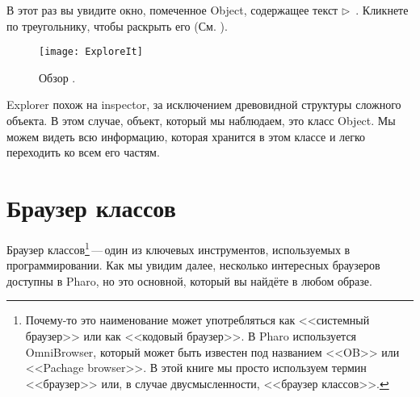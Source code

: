 \documentclass[a4paper,10pt,twoside]{book}
\begin{document}
В этот раз вы увидите окно, помеченное Object,
содержащее текст \mbox{$\triangleright$ }.
Кликнете по треугольнику, чтобы раскрыть его (См. ).

\begin{figure}[htb]
\centerline {\texttt{[image: ExploreIt]}}
\caption{Обзор . }
\end{figure}


Explorer похож на inspector, за исключением древовидной структуры
сложного объекта. В этом случае, объект, который мы наблюдаем,
это класс Object. Мы можем видеть всю информацию, которая хранится
в этом классе и легко переходить ко всем его частям.

\section{Браузер классов}


Браузер классов\footnote{Почему-то это наименование может
употребляться как <<системный браузер>> или как <<кодовый
браузер>>.
В Pharo используется OmniBrowser, который может быть известен под
названием <<OB>> или <<Pachage browser>>. В этой книге мы просто
используем термин <<браузер>> или, в случае двусмысленности,
<<браузер классов>>.}\,---\,один из ключевых инструментов,
используемых в
программировании. Как мы увидим далее, несколько интересных
браузеров доступны в  Pharo, но это основной, который вы найдёте в
любом образе.
 
\end{document}
